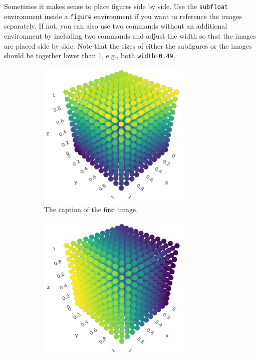 \documentclass[
    language=english, %
    thesis=bachelor, %
    supervisor=postdoc, %
    multiauthor=false, %
    ]{settings/csssa-thesis}
\begin{document}
Sometimes it makes sense to place figures side by side. Use the \texttt{subfloat} environment inside a \texttt{figure} environment if you want to reference the images separately. If not, you can also use two commands without an additional environment by including two  commands and adjust the width so that the images are placed side by side. Note that the sizes of either the subfigures or the images should be together lower than 1, e.g., both \texttt{width=0.49}.

\begin{figure}[ht]
    \centering
    \begin{subfigure}{0.49\textwidth}
        \centering
        \includegraphics[width=0.8\textwidth]{figures/dummy-subfigure1.png}
        \caption{The caption of the first image.}\label{ch02:fig:fig1a}
    \end{subfigure}
    \begin{subfigure}{0.49\textwidth}
        \centering
        \includegraphics[width=0.8\textwidth]{figures/dummy-subfigure2.png}

\end{subfigure}
\end{figure}
\end{document}
